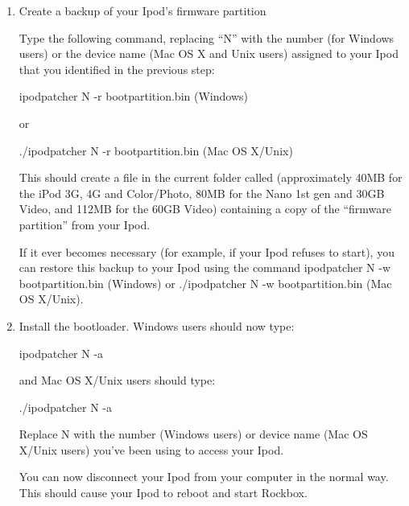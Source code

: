 \begin{enumerate}
  \item Create a backup of your Ipod's firmware partition

    Type the following command, replacing ``N'' with the number (for 
    Windows users) or the device name (Mac OS X and Unix users) assigned to 
    your Ipod that you identified in the previous step: 
      \begin{code} 
        ipodpatcher N -r bootpartition.bin (Windows) 
      \end{code}
      or
      \begin{code}
        ./ipodpatcher N -r bootpartition.bin (Mac OS X/Unix)
      \end{code}
  
    This should create a file in the current folder called 
     (approximately 40MB for the iPod 3G, 4G and 
    Color/Photo, 80MB for the Nano 1st gen and 30GB Video, and 112MB for the 
    60GB Video) containing a copy of the ``firmware partition'' from your Ipod.

    If it ever becomes necessary (for example, if your Ipod refuses to start), 
    you can restore this backup to your Ipod using the command ipodpatcher N -w 
    bootpartition.bin (Windows) or ./ipodpatcher N -w bootpartition.bin (Mac OS 
    X/Unix).   

 
  \item Install the bootloader.
    Windows users should now type:
    \begin{code}
      ipodpatcher N -a \bootloaderfile
    \end{code}

    and Mac OS X/Unix users should type:

    \begin{code}
      ./ipodpatcher N -a \bootloaderfile
    \end{code}

  Replace N with the number (Windows users) or device name (Mac OS X/Unix 
  users) you've been using to access your Ipod.  
  
  You can now disconnect your Ipod from your computer in the normal way. This 
  should cause your Ipod to reboot and start Rockbox.
  
  
\end{enumerate} 
